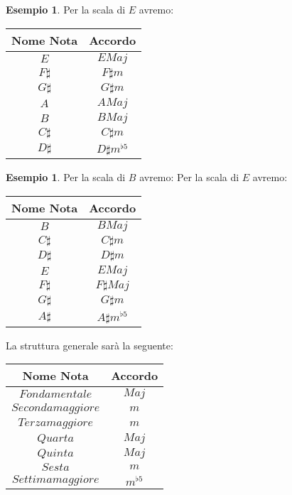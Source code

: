 \documentclass[12pt,a4paper]{book}
\theoremstyle{definition}
\theoremstyle{Theorem}
\theoremstyle{definition}
\newtheorem{Ex}[Def]{Esempio}
\theoremstyle{definition}
\theoremstyle{definition}
\begin{document}
	 		\begin{Ex}
	 			Per la scala di $E$ avremo:
	 				\begin{center}
	 				\begin{tabular}{||c|c||}
	 					\hline
	 					Nome Nota & Accordo\\
	 					\hline
	 					$E$ & $EMaj$\\
	 					\hline
	 					$F\sharp$ & $F\sharp m$\\
	 					\hline
	 					$G\sharp$ & $G\sharp m$\\
	 					\hline
	 					$A$ & $AMaj$\\
	 					\hline
	 					$B$ & $BMaj$\\
	 					\hline
	 					$C\sharp$ & $C\sharp m$\\
	 					\hline
	 					$D\sharp$ & $D\sharp m^{\flat5}$\\
	 					\hline
	 				\end{tabular}
	 			\end{center}
	 		\end{Ex}
	 		\begin{Ex}
	 			Per la scala di $B$ avremo:
	 				Per la scala di $E$ avremo:
	 			\begin{center}
	 				\begin{tabular}{||c|c||}
	 					\hline
	 					Nome Nota & Accordo\\
	 					\hline
	 					$B$ & $BMaj$\\
	 					\hline
	 					$C\sharp$ & $C\sharp m$\\
	 					\hline
	 					$D\sharp$ & $D\sharp m$\\
	 					\hline
	 					$E$ & $EMaj$\\
	 					\hline
	 					$F\sharp$ & $F\sharp Maj$\\
	 					\hline
	 					$G\sharp$ & $G\sharp m$\\
	 					\hline
	 					$A\sharp$ & $A\sharp m^{\flat5}$\\
	 					\hline
	 				\end{tabular}
	 			\end{center}
	 		\end{Ex}
	 		La struttura generale sarà la seguente:
	 		\begin{center}
	 			\begin{tabular}{||c|c||}
	 				\hline
	 				Nome Nota & Accordo\\
	 				\hline
	 				$Fondamentale$ & $Maj$\\
	 				\hline
	 				$Seconda maggiore$ & $m$\\
	 				\hline
	 				$Terza maggiore$ & $m$\\
	 				\hline
	 				$Quarta$ & $Maj$\\
	 				\hline
	 				$Quinta$ & $Maj$\\
	 				\hline
	 				$Sesta$ & $m$\\
	 				\hline
	 				$Settima maggiore$ & $m^{\flat5}$\\
	 				\hline
	 			\end{tabular}
	 		\end{center}
\end{document}
